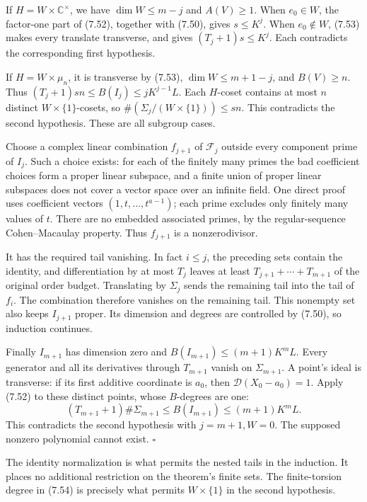 \documentclass[
  11pt,
  a4paper,
]{article}
\newcounter{none} %
\begin{document}
If \(H=W\times\mathbb C^\times\), we have \(\dim W\le m-j\) and
\(A(V)\ge1\). When \(e_0\in W\), the factor-one part of (7.52), together
with (7.50), gives \(s\le K^j\). When \(e_0\notin W\), (7.53) makes
every translate transverse, and gives \((T_j+1)s\le K^j\). Each
contradicts the corresponding first hypothesis.

If \(H=W\times\mu_n\), it is transverse by (7.53), \(\dim W\le m+1-j\),
and \(B(V)\ge n\). Thus \((T_j+1)sn\le B(I_j)\le jK^{j-1}L\). Each
\(H\)-coset contains at most \(n\) distinct \(W\times\{1\}\)-cosets, so
\(\#(\Sigma_j/(W\times\{1\}))\le sn\). This contradicts the second
hypothesis. These are all subgroup cases.

Choose a complex linear combination \(f_{j+1}\) of \(\mathcal F_j\)
outside every component prime of \(I_j\). Such a choice exists: for each
of the finitely many primes the bad coefficient choices form a proper
linear subspace, and a finite union of proper linear subspaces does not
cover a vector space over an infinite field. One direct proof uses
coefficient vectors \((1,t,\ldots,t^{a-1})\); each prime excludes only
finitely many values of \(t\). There are no embedded associated primes,
by the regular-sequence Cohen--Macaulay property. Thus \(f_{j+1}\) is a
nonzerodivisor.

It has the required tail vanishing. In fact \(i\le j\), the preceding
sets contain the identity, and differentiation by at most \(T_j\) leaves
at least \(T_{j+1}+\cdots+T_{m+1}\) of the original order budget.
Translating by \(\Sigma_j\) sends the remaining tail into the tail of
\(f_i\). The combination therefore vanishes on the remaining tail. This
nonempty set also keeps \(I_{j+1}\) proper. Its dimension and degrees
are controlled by (7.50), so induction continues.

Finally \(I_{m+1}\) has dimension zero and \(B(I_{m+1})\le(m+1)K^mL\).
Every generator and all its derivatives through \(T_{m+1}\) vanish on
\(\Sigma_{m+1}\). A point's ideal is transverse: if its first additive
coordinate is \(a_0\), then \(\mathcal D(X_0-a_0)=1\). Apply (7.52) to
these distinct points, whose \(B\)-degrees are one: \[
(T_{m+1}+1)\#\Sigma_{m+1}\le B(I_{m+1})\le(m+1)K^mL.
\] This contradicts the second hypothesis with \(j=m+1,W=0\). The
supposed nonzero polynomial cannot exist. \(\square\)

The identity normalization is what permits the nested tails in the
induction. It places no additional restriction on the theorem's finite
sets. The finite-torsion degree in (7.54) is precisely what permits
\(W\times\{1\}\) in the second hypothesis.
\end{document}
